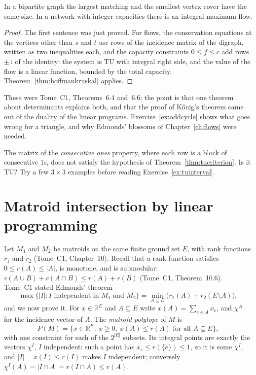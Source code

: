 \begin{corollary}\label{cor:koniglp}
In a bipartite graph the largest matching and the smallest vertex cover have the same size. In a network with integer capacities there is an integral maximum flow.
\end{corollary}
\begin{proof}
The first sentence was just proved. For flows, the conservation equations at the vertices other than $s$ and $t$ use rows of the incidence matrix of the digraph, written as two inequalities each, and the capacity constraints
$0\le f\le c$ add rows $\pm1$ of the identity: the system is TU with integral right side, and the value of the flow is a linear function, bounded by the total capacity. Theorem~\ref{thm:hoffmankruskal} applies.
\end{proof}

These were Tome~C1, Theorems~6.4 and~6.6; the point is that one theorem about determinants explains both, and that the proof of K\H onig's theorem came out of the duality of the linear programs. Exercise~\ref{ex:oddcycle} shows what goes wrong
for a triangle, and why Edmonds' blossoms of Chapter~\ref{ch:flows} were needed.

\begin{think}
The matrix of the \emph{consecutive ones} property, where each row is a block of consecutive $1$s, does not satisfy the hypothesis of Theorem~\ref{thm:tucriterion}. Is it TU? Try a few $3\times3$ examples before reading
Exercise~\ref{ex:tuinterval}.
\end{think}

\section{Matroid intersection by linear programming}\label{sec:matroidlp}

Let $M_1$ and $M_2$ be matroids on the same finite ground set $E$, with rank functions $r_1$ and $r_2$ (Tome~C1, Chapter~10). Recall that a rank function satisfies $0\le r(A)\le|A|$, is monotone, and is submodular:
$r(A\cup B)+r(A\cap B)\le r(A)+r(B)$ (Tome~C1, Theorem~10.6). Tome~C1 stated Edmonds' theorem
\[
\max\{|I|:I\text{ independent in }M_1\text{ and }M_2\}=\min_{A\subseteq E}\bigl(r_1(A)+r_2(E\setminus A)\bigr),
\]
and we now prove it. For $x\in\mathbb R^E$ and $A\subseteq E$ write $x(A)=\sum_{e\in A}x_e$, and $\chi^A$ for the incidence vector of $A$. The \emph{matroid polytope} of $M$ is
\[
P(M)=\{x\in\mathbb R^E:\ x\ge0,\ x(A)\le r(A)\text{ for all }A\subseteq E\},
\]
with one constraint for each of the $2^{|E|}$ subsets. Its integral points are exactly the vectors $\chi^I$, $I$ independent: such a point has $x_e\le r(\{e\})\le1$, so it is some $\chi^I$, and $|I|=x(I)\le r(I)$ makes $I$
independent; conversely $\chi^I(A)=|I\cap A|=r(I\cap A)\le r(A)$.

